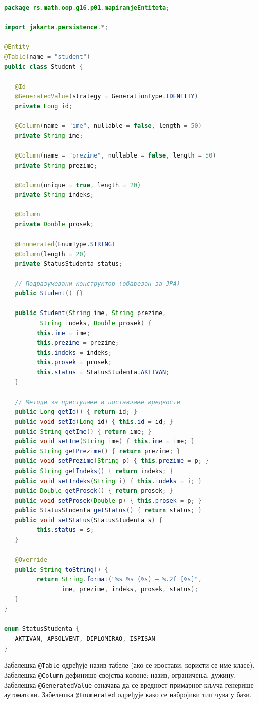 \begin{lstlisting}[language=Java]
package rs.math.oop.g16.p01.mapiranjeEntiteta;
 
import jakarta.persistence.*;
 
@Entity
@Table(name = "student")
public class Student {
 
   @Id
   @GeneratedValue(strategy = GenerationType.IDENTITY)
   private Long id;
 
   @Column(name = "ime", nullable = false, length = 50)
   private String ime;
 
   @Column(name = "prezime", nullable = false, length = 50)
   private String prezime;
 
   @Column(unique = true, length = 20)
   private String indeks;
 
   @Column
   private Double prosek;
 
   @Enumerated(EnumType.STRING)
   @Column(length = 20)
   private StatusStudenta status;
 
   // Подразумевани конструктор (обавезан за JPA)
   public Student() {}
 
   public Student(String ime, String prezime,
          String indeks, Double prosek) {
         this.ime = ime;
         this.prezime = prezime;
         this.indeks = indeks;
         this.prosek = prosek;
         this.status = StatusStudenta.AKTIVAN;
   }
 
   // Методи за приступање и постављање вредности
   public Long getId() { return id; }
   public void setId(Long id) { this.id = id; }
   public String getIme() { return ime; }
   public void setIme(String ime) { this.ime = ime; }
   public String getPrezime() { return prezime; }
   public void setPrezime(String p) { this.prezime = p; }
   public String getIndeks() { return indeks; }
   public void setIndeks(String i) { this.indeks = i; }
   public Double getProsek() { return prosek; }
   public void setProsek(Double p) { this.prosek = p; }
   public StatusStudenta getStatus() { return status; }
   public void setStatus(StatusStudenta s) {
         this.status = s;
   }
 
   @Override
   public String toString() {
         return String.format("%s %s (%s) – %.2f [%s]",
                ime, prezime, indeks, prosek, status);
   }
}
 
enum StatusStudenta {
   AKTIVAN, APSOLVENT, DIPLOMIRAO, ISPISAN
}
\end{lstlisting}


Забелешка \texttt{@Table} одређује назив табеле (ако се изостави, користи се име класе). Забелешка \texttt{@Column} дефинише својства колоне: назив, ограничења, дужину. Забелешка \texttt{@GeneratedValue} означава да се вредност примарног кључа генерише аутоматски. Забелешка \texttt{@Enumerated} одређује како се набројиви тип чува у бази.


